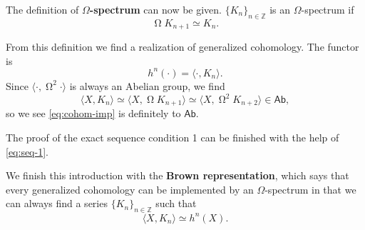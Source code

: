 \documentclass[hyperref, a4paper]{article}
\newcommand*{\concept}[1]{{\textbf{#1}}}
\DeclareMathOperator{\loopspace}{\Omega}
\begin{document}
The definition of \concept{$\Omega$-spectrum} can now be given. $\{K_n\}_{n \in \mathbb{Z}}$ is an $\Omega$-spectrum if 
\begin{equation}
    \loopspace K_{n+1} \simeq K_n.
\end{equation}

From this definition we find a realization of generalized cohomology. The functor is 
\begin{equation}
    h^n(\cdot) = \langle \cdot, K_n \rangle.
    \label{eq:cohom-imp}
\end{equation}
Since $\langle \cdot, \loopspace^2 \cdot \rangle$ is always an Abelian group,
we find 
\[
    \langle X, K_n \rangle \simeq \langle X, \loopspace K_{n+1} \rangle \simeq \langle X, \loopspace^2 K_{n+2} \rangle \in \mathsf{Ab},
\]
so we see \eqref{eq:cohom-imp} is definitely to $\mathsf{Ab}$.

The proof of the exact sequence condition 1 can be finished with the help of \eqref{eq:seq-1}.

We finish this introduction with the \concept{Brown representation}, which says that every generalized cohomology can be implemented 
by an $\Omega$-spectrum in that we can always find a series $\{K_n\}_{n \in \mathbb{Z}}$ such that 
\begin{equation}
    \langle X, K_n \rangle \simeq h^n(X).
\end{equation}
\end{document}
